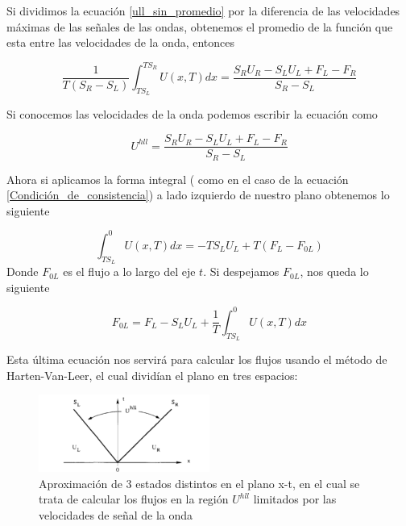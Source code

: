 \documentclass[12pt,a4paper]{book}
\begin{document}
Si dividimos la ecuación \ref{ull_sin_promedio} por la diferencia de las velocidades máximas de las señales de las ondas, obtenemos el promedio de la función que esta entre las velocidades de la onda, entonces

\begin{equation}
\frac{1}{T \left( S_R -S_L \right)}\int_{T S_L}^{T S_R} U \left(x, T \right)dx =
\frac{S_R U_R - S_L U_L + F_L - F_R}{S_R - S_L}
\end{equation}

Si conocemos las velocidades de la onda podemos escribir la ecuación como 

\begin{equation}\label{u_hll}
U^{hll} = \frac{S_R U_R - S_L U_L + F_L - F_R}{S_R - S_L}
\end{equation}

Ahora si aplicamos la forma integral ( como en el caso de la ecuación \ref{Condición_de_consistencia}) a lado izquierdo de nuestro plano obtenemos lo siguiente

\begin{equation}
\int_{T S_L}^{0} U\left( x, T \right) dx = 
-T S_L U_L+T \left( F_L- F_{0L} \right)
\end{equation}
Donde $F_{0L}$ es el flujo a lo largo del eje $t$. Si despejamos $F_{0L}$, nos queda lo siguiente

\begin{equation}\label{ec F_0L}
F_{0L} = F_L - S_L U_L + \frac{1}{T}  \int_{T S_L}^{0} U\left( x, T \right) dx
\end{equation}

Esta última ecuación nos servirá para calcular los flujos usando el método de Harten-Van-Leer, el cual dividían el plano en tres espacios:

\begin{figure} %
  \centering
    \includegraphics[width=0.5\textwidth]{Figuras/HLL.png}
  \caption{Aproximación de 3 estados distintos en el plano x-t, en el cual se trata de calcular los flujos en la región $U^{hll}$ limitados por las velocidades de señal de la onda}
  \label{fig:HLL}
\end{figure}
\end{document}
